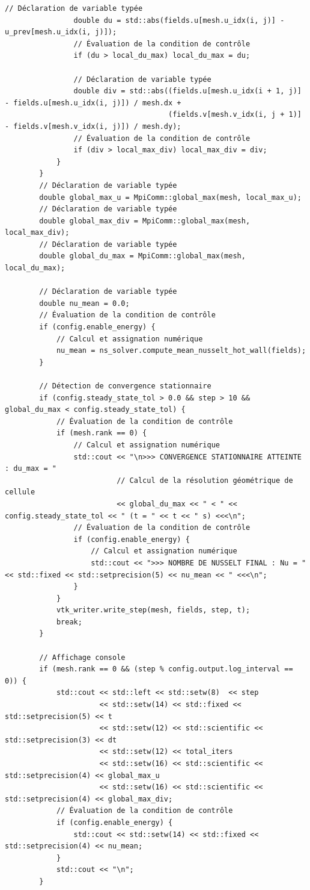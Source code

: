 \documentclass[10pt,a4paper,oneside]{book}
\begin{document}
\begin{lstlisting}[language={[11]C++}]
                // Déclaration de variable typée
                double du = std::abs(fields.u[mesh.u_idx(i, j)] - u_prev[mesh.u_idx(i, j)]);
                // Évaluation de la condition de contrôle
                if (du > local_du_max) local_du_max = du;

                // Déclaration de variable typée
                double div = std::abs((fields.u[mesh.u_idx(i + 1, j)] - fields.u[mesh.u_idx(i, j)]) / mesh.dx +
                                      (fields.v[mesh.v_idx(i, j + 1)] - fields.v[mesh.v_idx(i, j)]) / mesh.dy);
                // Évaluation de la condition de contrôle
                if (div > local_max_div) local_max_div = div;
            }
        }
        // Déclaration de variable typée
        double global_max_u = MpiComm::global_max(mesh, local_max_u);
        // Déclaration de variable typée
        double global_max_div = MpiComm::global_max(mesh, local_max_div);
        // Déclaration de variable typée
        double global_du_max = MpiComm::global_max(mesh, local_du_max);

        // Déclaration de variable typée
        double nu_mean = 0.0;
        // Évaluation de la condition de contrôle
        if (config.enable_energy) {
            // Calcul et assignation numérique
            nu_mean = ns_solver.compute_mean_nusselt_hot_wall(fields);
        }

        // Détection de convergence stationnaire
        if (config.steady_state_tol > 0.0 && step > 10 && global_du_max < config.steady_state_tol) {
            // Évaluation de la condition de contrôle
            if (mesh.rank == 0) {
                // Calcul et assignation numérique
                std::cout << "\n>>> CONVERGENCE STATIONNAIRE ATTEINTE : du_max = "
                          // Calcul de la résolution géométrique de cellule
                          << global_du_max << " < " << config.steady_state_tol << " (t = " << t << " s) <<<\n";
                // Évaluation de la condition de contrôle
                if (config.enable_energy) {
                    // Calcul et assignation numérique
                    std::cout << ">>> NOMBRE DE NUSSELT FINAL : Nu = " << std::fixed << std::setprecision(5) << nu_mean << " <<<\n";
                }
            }
            vtk_writer.write_step(mesh, fields, step, t);
            break;
        }

        // Affichage console
        if (mesh.rank == 0 && (step % config.output.log_interval == 0)) {
            std::cout << std::left << std::setw(8)  << step
                      << std::setw(14) << std::fixed << std::setprecision(5) << t
                      << std::setw(12) << std::scientific << std::setprecision(3) << dt
                      << std::setw(12) << total_iters
                      << std::setw(16) << std::scientific << std::setprecision(4) << global_max_u
                      << std::setw(16) << std::scientific << std::setprecision(4) << global_max_div;
            // Évaluation de la condition de contrôle
            if (config.enable_energy) {
                std::cout << std::setw(14) << std::fixed << std::setprecision(4) << nu_mean;
            }
            std::cout << "\n";
        }


\end{lstlisting}
\end{document}
